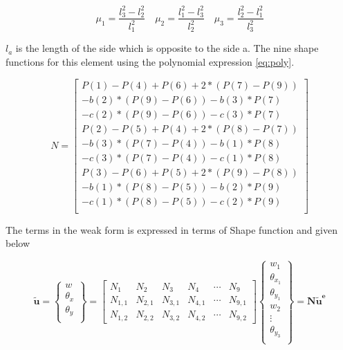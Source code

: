 \documentclass[main.tex]{subfiles}
\begin{document}
\begin{equation}
\mu_1 = \frac{l_3^2-l_2^2}{l_1^2} \quad
\mu_2 = \frac{l_1^2-l_3^2}{l_2^2} \quad
\mu_3 = \frac{l_2^2-l_1^2}{l_3^2}
\end{equation}

$l_a$ is the length of the side which is opposite to the side a. The nine shape functions for this element using the polynomial expression \ref{eq:poly}.

\begin{equation}
N = 
\begin{bmatrix}
                 P(1)-P(4)+P(6)+2*(P(7)-P(9))\\
                 -b(2)*(P(9)-P(6))-b(3)*P(7)\\
                 -c(2)*(P(9)-P(6))-c(3)*P(7)\\
                 P(2)-P(5)+P(4)+2*(P(8)-P(7))\\
                 -b(3)*(P(7)-P(4))-b(1)*P(8)\\
                 -c(3)*(P(7)-P(4))-c(1)*P(8)\\
                 P(3)-P(6)+P(5)+2*(P(9)-P(8))\\
                -b(1)*(P(8)-P(5))-b(2)*P(9)\\
                -c(1)*(P(8)-P(5))-c(2)*P(9)\\
\end{bmatrix}
\end{equation}

The terms in the weak form is expressed in terms of Shape function and given below





\begin{equation*}
\tilde{\mathbf{u}}= 
\left\{
\begin{array}{r}
w \\
\theta_x \\
\theta_y \\
\end{array} \right\}
=
\begin{bmatrix}
{N}_{1} & N_{2} & N_{3} &{N}_{4} &\cdots & N_{9} \\
{N}_{1,1} & N_{2,1} & N_{3,1} &{N}_{4,1} &\cdots & N_{9,1} \\
{N}_{1,2} & N_{2,2} & N_{3,2} &{N}_{4,2} &\cdots & N_{9,2} 
\end{bmatrix} 
\left\{
\begin{array}{r}
w_1 \\
\theta_{x_1} \\
\theta_{y_1} \\
w_2 \\
\vdots \\
\theta_{y_{3}} \\
\end{array} \right\}
=
\mathbf{N} \mathbf{\tilde{u}^e} 
\end{equation*}
\end{document}
